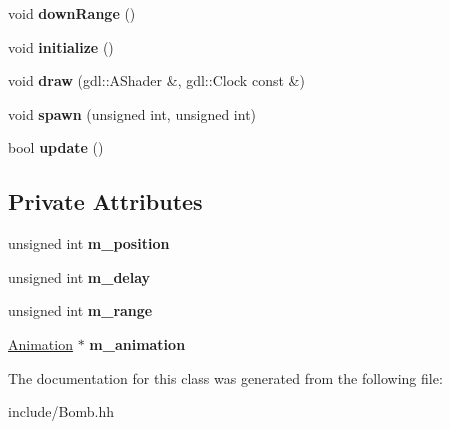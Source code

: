 \begin{DoxyCompactItemize}
\item 
\hypertarget{class_bomb_a59c320d137823583356b7e9633352fca}{}void {\bfseries down\+Range} ()\label{class_bomb_a59c320d137823583356b7e9633352fca}

\item 
\hypertarget{class_bomb_a37100b5e5dbfc827b6c4fab2b9c4bf7a}{}void {\bfseries initialize} ()\label{class_bomb_a37100b5e5dbfc827b6c4fab2b9c4bf7a}

\item 
\hypertarget{class_bomb_addb072f03e0944c7d0158db8b271b4b9}{}void {\bfseries draw} (gdl\+::\+A\+Shader \&, gdl\+::\+Clock const \&)\label{class_bomb_addb072f03e0944c7d0158db8b271b4b9}

\item 
\hypertarget{class_bomb_a2b62c984c12f92d2b4141c7810e34d93}{}void {\bfseries spawn} (unsigned int, unsigned int)\label{class_bomb_a2b62c984c12f92d2b4141c7810e34d93}

\item 
\hypertarget{class_bomb_a9808d8efcc57b9ce7b0bd48d95875aad}{}bool {\bfseries update} ()\label{class_bomb_a9808d8efcc57b9ce7b0bd48d95875aad}

\end{DoxyCompactItemize}
\subsection*{Private Attributes}
\begin{DoxyCompactItemize}
\item 
\hypertarget{class_bomb_a8b66702d186d0b4655fd6b9fbf42180f}{}unsigned int {\bfseries m\+\_\+position}\label{class_bomb_a8b66702d186d0b4655fd6b9fbf42180f}

\item 
\hypertarget{class_bomb_a433308ad3f4b6adbe170ccfdeb4d3d25}{}unsigned int {\bfseries m\+\_\+delay}\label{class_bomb_a433308ad3f4b6adbe170ccfdeb4d3d25}

\item 
\hypertarget{class_bomb_ab01fd8c164613c910fef3786fe4ccf31}{}unsigned int {\bfseries m\+\_\+range}\label{class_bomb_ab01fd8c164613c910fef3786fe4ccf31}

\item 
\hypertarget{class_bomb_acb1714a54565b3aa66858cf58dbe3c53}{}\hyperlink{class_animation}{Animation} $\ast$ {\bfseries m\+\_\+animation}\label{class_bomb_acb1714a54565b3aa66858cf58dbe3c53}

\end{DoxyCompactItemize}


The documentation for this class was generated from the following file\+:\begin{DoxyCompactItemize}
\item 
include/Bomb.\+hh\end{DoxyCompactItemize}
